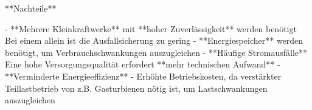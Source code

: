 \begin{markdown}
**Nachteile**

- **Mehrere Kleinkraftwerke** mit **hoher Zuverlässigkeit** werden benötigt Bei einem allein ist die Ausfallsicherung zu gering
- **Energiespeicher** werden benötigt, um Verbrauchschwankungen auszugleichen
- **Häufige Stromausfälle** Eine hohe Versorgungsqualität erfordert **mehr technischen Aufwand**
- **Verminderte Energieeffizienz** -  Erhöhte Betriebskosten, da verstärkter Teillastbetrieb von z.B. Gasturbienen nötig ist, um Lastschwankungen auszugleichen

\end{markdown}